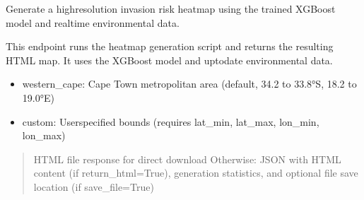 \documentclass[letterpaper,10pt,english]{sphinxmanual}
\begin{document}
\begin{fulllineitems}
\label{\detokenize{api_reference:app.routers.predictions.generate_xgboost_heatmap}}
\pysigstartsignatures
\pysiglinewithargsret
{}
{\sphinxparamcomma {}\sphinxparamcomma {}\sphinxparamcomma {}\sphinxparamcomma {}\sphinxparamcomma {}\sphinxparamcomma {}\sphinxparamcomma {}}
{}
\pysigstopsignatures
\sphinxAtStartPar
Generate a high\sphinxhyphen{}resolution invasion risk heatmap using the trained XGBoost model and real\sphinxhyphen{}time environmental data.

\sphinxAtStartPar
This endpoint runs the heatmap generation script and returns the resulting HTML map. It uses the XGBoost model and up\sphinxhyphen{}to\sphinxhyphen{}date environmental data.
\begin{description}
\begin{itemize}
\item {} 
\sphinxAtStartPar
western\_cape: Cape Town metropolitan area (default, \sphinxhyphen{}34.2 to \sphinxhyphen{}33.8°S, 18.2 to 19.0°E)

\item {} 
\sphinxAtStartPar
custom: User\sphinxhyphen{}specified bounds (requires lat\_min, lat\_max, lon\_min, lon\_max)

\end{itemize}

\end{description}
\begin{quote}\begin{description}
\sphinxAtStartPar
HTML file response for direct download
\sphinxhyphen{} Otherwise: JSON with HTML content (if return\_html=True), generation statistics, and optional file save location (if save\_file=True)


\end{description}
\end{quote}
\end{fulllineitems}
\end{document}
